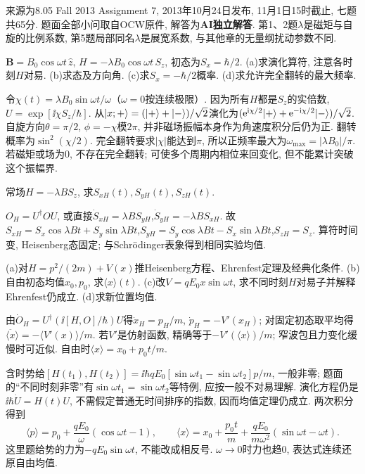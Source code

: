 来源为8.05 Fall 2013 Assignment 7, 2013年10月24日发布, 11月1日15时截止, 七题共65分. 题面全部小问取自OCW原件, 解答为\textbf{AI独立解答}. 第1、2题$\lambda$是磁矩与自旋的比例系数, 第5题局部同名$\lambda$是展宽系数, 与其他章的无量纲扰动参数不同.
\begin{exercise}
$\boldsymbol B=B_0\cos\omega t\,\hat z$, $H=-\lambda B_0\cos\omega t\,S_z$, 初态为$S_x=\hbar/2$. (a)求演化算符, 注意各时刻$H$对易. (b)求态及方向角. (c)求$S_x=-\hbar/2$概率. (d)求允许完全翻转的最大频率.
\end{exercise}
\begin{solution}
令$\chi(t)=\lambda B_0\sin\omega t/\omega$（$\omega=0$按连续极限）. 因为所有$H$都是$S_z$的实倍数,$U=\exp[\ii\chi S_z/\hbar]$. 从$\lvert x;+\rangle=(\lvert +\rangle+\lvert -\rangle)/\sqrt2$演化为$(\mathrm e^{\mathrm i\chi/2}\lvert +\rangle+\mathrm e^{-\mathrm i\chi/2}\lvert -\rangle)/\sqrt2$. 自旋方向$\theta=\pi/2$, $\phi=-\chi$模$2\pi$, 并非磁场振幅本身作为角速度积分后仍为正. 翻转概率为$\sin^2(\chi/2)$. 完全翻转要求$|\chi|$能达到$\pi$, 所以正频率最大为$\omega_{\max}=|\lambda B_0|/\pi$. 若磁矩或场为0, 不存在完全翻转; 可使多个周期内相位来回变化, 但不能累计突破这个振幅界.
\end{solution}
\begin{exercise}
常场$H=-\lambda BS_z$, 求$S_{xH}(t),S_{yH}(t),S_{zH}(t)$.
\end{exercise}
\begin{solution}
$O_H=U^\dagger OU$, 或直接$\dot S_{xH}=\lambda BS_{yH}$,$\dot S_{yH}=-\lambda BS_{xH}$. 故$S_{xH}=S_x\cos\lambda Bt+S_y\sin\lambda Bt$,$S_{yH}=S_y\cos\lambda Bt-S_x\sin\lambda Bt$,$S_{zH}=S_z$. 算符时间变, Heisenberg态固定; 与Schrödinger表象得到相同实验均值.
\end{solution}
\begin{exercise}
(a)对$H=p^2/(2m)+V(x)$推Heisenberg方程、Ehrenfest定理及经典化条件. (b)自由初态均值$x_0,p_0$, 求$\langle x\rangle(t)$. (c)改$V=qE_0x\sin\omega t$, 求不同时刻$H$对易子并解释Ehrenfest仍成立. (d)求新位置均值.
\end{exercise}
\begin{solution}
由$\dot O_H=U^\dagger(\ii[H,O]/\hbar)U$得$\dot x_H=p_H/m$, $\dot p_H=-V'(x_H)$; 对固定初态取平均得$\ddot{\langle x\rangle}=-\langle V'(x)\rangle/m$. 若$V'$是仿射函数, 精确等于$-V'(\langle x\rangle)/m$; 窄波包且力变化缓慢时可近似. 自由时$\langle x\rangle=x_0+p_0t/m$.

含时势给$[H(t_1),H(t_2)]=\ii\hbar qE_0[\sin\omega t_1-\sin\omega t_2]p/m$, 一般非零; 题面的“不同时刻非零”有$\sin\omega t_1=\sin\omega t_2$等特例, 应按一般不对易理解. 演化方程仍是$\ii\hbar\dot U=H(t)U$, 不需假定普通无时间排序的指数, 因而均值定理仍成立. 两次积分得到
\[
\langle p\rangle=p_0+\frac{qE_0}{\omega}(\cos\omega t-1),\qquad
\langle x\rangle=x_0+\frac{p_0t}m+\frac{qE_0}{m\omega^2}(\sin\omega t-\omega t).
\]
这里题给势的力为$-qE_0\sin\omega t$, 不能改成相反号. $\omega\to0$时力也趋0, 表达式连续还原自由均值.
\end{solution}
